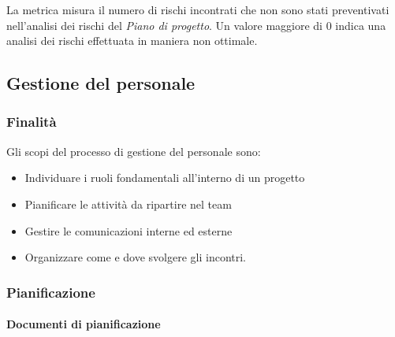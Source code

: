 \documentclass[../norme-di-progetto.tex]{subfiles}
\begin{document}
La metrica misura il numero di rischi incontrati che non sono stati preventivati nell'analisi dei rischi del \textit{Piano di progetto}. Un valore maggiore di 0 indica una analisi dei rischi effettuata in maniera non ottimale.

\subsection{Gestione del personale}%
\label{sub:gestione_del_personale}

\subsubsection{Finalità}%
\label{subs:gestione_del_personale/finalita}

Gli scopi del processo di gestione del personale sono:

\begin{itemize}
  \item Individuare i ruoli fondamentali all'interno di un progetto
  \item Pianificare le attività da ripartire nel team
  \item Gestire le comunicazioni interne ed esterne
  \item Organizzare come e dove svolgere gli incontri.
\end{itemize}

\subsubsection{Pianificazione}%
\label{subs:pianificazione}

\paragraph{Documenti di pianificazione}%
\label{par:documenti_di_pianificazione}
\end{document}
